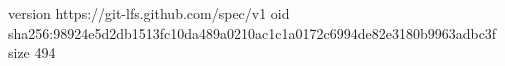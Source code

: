 version https://git-lfs.github.com/spec/v1
oid sha256:98924e5d2db1513fc10da489a0210ac1c1a0172c6994de82e3180b9963adbc3f
size 494
